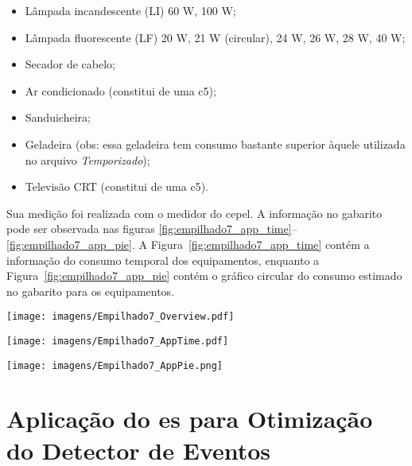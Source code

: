 \begin{itemize}
\item Lâmpada incandescente (LI) 60 W, 100 W;
\item Lâmpada fluorescente (LF) 20 W, 21 W (circular), 24 W, 26 W, 28
W, 40 W;
\item Secador de cabelo;
\item Ar condicionado (constitui de uma \acs{c5});
\item Sanduicheira;
\item Geladeira (obs: essa geladeira tem consumo bastante superior
àquele utilizada no arquivo \emph{Temporizado});
\item Televisão CRT (constitui de uma \acs{c5}).
\end{itemize}

Sua medição foi realizada com o medidor do \acs{cepel}.  A informação
no gabarito pode ser observada nas figuras
\ref{fig:empilhado7_app_time}--\ref{fig:empilhado7_app_pie}.  A
Figura~\ref{fig:empilhado7_app_time} contém a informação do consumo
temporal dos equipamentos, enquanto a
Figura~\ref{fig:empilhado7_app_pie} contém o gráfico circular do
consumo estimado no gabarito para os equipamentos.


\begin{sidewaysfigure}[p]
\centering
\texttt{[image: imagens/Empilhado7\_Overview.pdf]}
\caption{Perfil de consumo agregado para o conjunto de dados \emph{Empilhado7}.}
\label{fig:empilhado7_overview}
\end{sidewaysfigure}

\begin{sidewaysfigure}[p]
\centering
\texttt{[image: imagens/Empilhado7\_AppTime.pdf]}
\caption{Informação no gabarito para o conjunto de dados
\emph{Empilhado7}: consumo temporal dos equipamentos.}
\label{fig:empilhado7_app_time}
\end{sidewaysfigure}

\begin{sidewaysfigure}[p]
\centering
\texttt{[image: imagens/Empilhado7\_AppPie.png]}
\caption{Informação no gabarito para o conjunto de dados
\emph{Empilhado7}: gráfico circular do consumo dos equipamentos.}
\label{fig:empilhado7_app_pie}
\end{sidewaysfigure}

\FloatBarrier

\section[Aplicação do ES para Otimização do Detector de Eventos]{
Aplicação do \acf{es} para Otimização do Detector de Eventos}
\label{sec:aplic_es}

